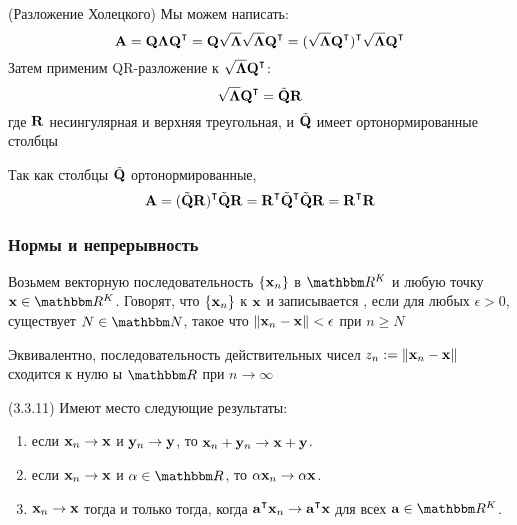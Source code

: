 \begin{frame}

    \vspace{2em}
    \Prf (Разложение Холецкого)
    Мы можем написать:
        \begin{equation*}
            \boldA 
            = \boldQ \boldLambda \boldQ^\T
            = \boldQ \sqrt{\boldLambda} \sqrt{ \boldLambda} \boldQ^\T
            = (\sqrt{ \boldLambda} \boldQ^\T)^\T \sqrt{ \boldLambda} \boldQ^\T
        \end{equation*}
    Затем применим QR-разложение к $\sqrt{ \boldLambda} \boldQ^\T$:
        $$\sqrt{ \boldLambda} \boldQ^\T = \tilde \boldQ \boldR$$
    где $\mathbf R$ несингулярная и верхняя треугольная, и $\tilde {\mathbf Q}$ имеет
    ортонормированные столбцы
    
    \vspace{.7em}
    Так как столбцы $\tilde {\mathbf Q}$ ортонормированные,
        \begin{equation*}
        \boldA 
        = (\tilde \boldQ \boldR)^\T \tilde \boldQ \boldR
        =  \boldR^\T \tilde \boldQ^\T \tilde \boldQ \boldR
        =  \boldR^\T \boldR
        \end{equation*}
    
\end{frame}


\begin{frame}

    \vspace{2em}
    \frametitle{Нормы и непрерывность}
    
    Возьмем векторную последовательность $\{{\mathbf x}_n\}$ в $\RR^K$ и любую точку 
    $\boldx \in \RR^K$. Говорят, что $\{{\mathbf x}_n\}$  к ${\mathbf x}$ и 
    записывается
    , если для любых $\epsilon > 0$, существует $N
    \in \NN$, такое что $\|{\mathbf x}_n - {\mathbf x}\| < \epsilon$ при $n \geq N$
    
    \vspace{.7em}
    Эквивалентно, последовательность действительных чисел $z_n := \|{\mathbf x}_n - {\mathbf x}\|$
    сходится к нулю ы $\RR$ при $n \to \infty$

\end{frame}

\begin{frame}
    
    \vspace{2em}
    \Fact (3.3.11)
    Имеют место следующие результаты:
    \begin{enumerate}
        \item если ${\mathbf x}_n \to {\mathbf x}$ и ${\mathbf y}_n \to {\mathbf y}$, то ${\mathbf x}_n +
            {\mathbf y}_n \to {\mathbf x} +  {\mathbf y}$.
        \item если ${\mathbf x}_n \to {\mathbf x}$ и $\alpha \in \RR$, то $\alpha {\mathbf x}_n 
            \to \alpha {\mathbf x}$.
        \item ${\mathbf x}_n \to {\mathbf x}$ тогда и только тогда, когда $\bolda^\T \boldx_n \to
            \bolda^\T \boldx$ для всех $\bolda \in \RR^K$.
    \end{enumerate}


\end{frame}

